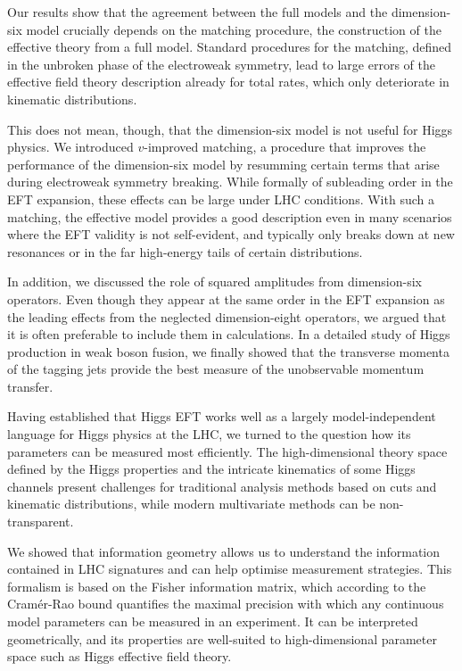 Our results show that the agreement between the full models and the
dimension-six model crucially depends on the matching procedure, \ie
the construction of the effective theory from a full model. Standard
procedures for the matching, defined in the unbroken phase of the
electroweak symmetry, lead to large errors of the effective field
theory description already for total rates, which only deteriorate
in kinematic distributions.

This does not mean, though, that the dimension-six model is not useful
for Higgs physics. We introduced $v$-improved matching, a procedure
that improves the performance of the dimension-six model by resumming
certain terms that arise during electroweak symmetry breaking. While
formally of subleading order in the EFT expansion, these effects can
be large under LHC conditions. With such a matching, the effective
model provides a good description even in many scenarios where the EFT
validity is not self-evident, and typically only breaks down at new
resonances or in the far high-energy tails of certain distributions.

In addition, we discussed the role of squared amplitudes from dimension-six
operators. Even though they appear at the same order in the EFT
expansion as the leading effects from the neglected dimension-eight
operators, we argued that it is often preferable to include them
in calculations. In a detailed study of Higgs production in weak boson
fusion, we finally showed that the transverse momenta of the tagging
jets provide the best measure of the unobservable momentum transfer.

\newparagraph
%
Having established that Higgs EFT works well as a largely
model-independent language for Higgs physics at the LHC, we turned to
the question how its parameters can be measured most efficiently. The
high-dimensional theory space defined by the Higgs properties and the
intricate kinematics of some Higgs channels present challenges for
traditional analysis methods based on cuts and kinematic
distributions, while modern multivariate methods can be non-transparent.

We showed that information geometry allows us to understand the
information contained in LHC signatures and can help optimise
measurement strategies. This formalism is based on the Fisher
information matrix, which according to the Cram\'er-Rao bound
quantifies the maximal precision with which any continuous model
parameters can be measured in an experiment. It can be interpreted
geometrically, and its properties are well-suited to high-dimensional
parameter space such as Higgs effective field theory.

